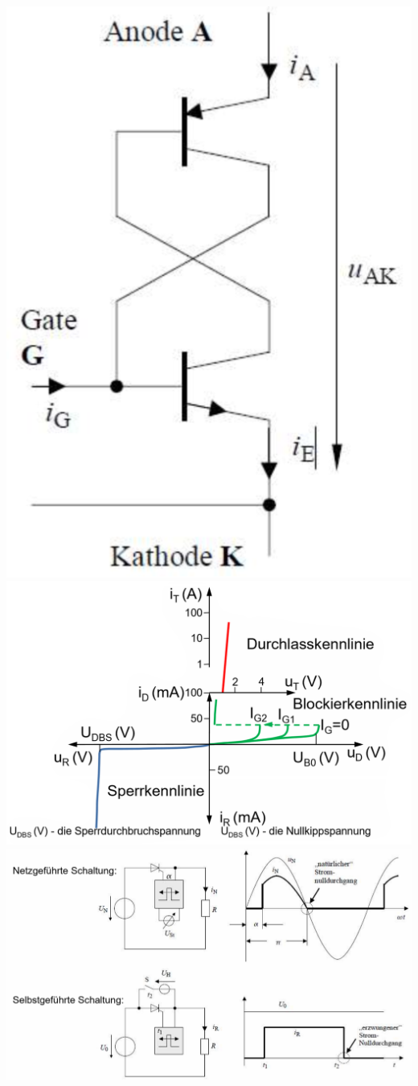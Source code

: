 \includegraphics[width=0.15\linewidth]{images/thyrESB}
\includegraphics[width=0.4\linewidth]{images/thyrKennlinie}
\includegraphics[width=0.45\linewidth]{images/thyrSchaltung}

